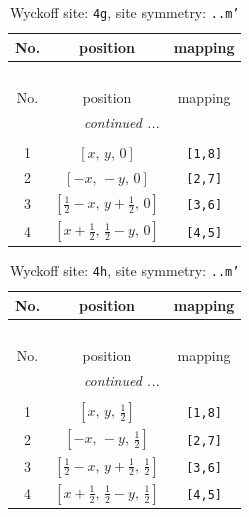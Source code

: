 \documentclass[fleqn,8pt]{jsarticle}
\begin{document}
\renewcommand{\arraystretch}{1.2}
\begin{longtable}{ccc}
\caption{Wyckoff site: {\tt 4g}, site symmetry: {\tt ..m'}}
 \\
 \hline \hline
No. & position & mapping \\ \hline \endfirsthead

\multicolumn{2}{l}{\tablename\ \thetable{}} \\
 \hline \hline
No. & position & mapping \\ \hline \endhead

 \hline \hline
\multicolumn{2}{r}{\footnotesize\it continued ...} \\ \endfoot

 \hline \hline
\multicolumn{2}{r}{} \\ \endlastfoot

1 & $\left[ x,\, y,\, 0 \right]$ & {\tt [1,8]} \\ \hline
2 & $\left[ - x,\, - y,\, 0 \right]$ & {\tt [2,7]} \\ \hline
3 & $\left[ \frac{1}{2} - x,\, y + \frac{1}{2},\, 0 \right]$ & {\tt [3,6]} \\ \hline
4 & $\left[ x + \frac{1}{2},\, \frac{1}{2} - y,\, 0 \right]$ & {\tt [4,5]} \\
\end{longtable}
\renewcommand{\arraystretch}{1.2}
\begin{longtable}{ccc}
\caption{Wyckoff site: {\tt 4h}, site symmetry: {\tt ..m'}}
 \\
 \hline \hline
No. & position & mapping \\ \hline \endfirsthead

\multicolumn{2}{l}{\tablename\ \thetable{}} \\
 \hline \hline
No. & position & mapping \\ \hline \endhead

 \hline \hline
\multicolumn{2}{r}{\footnotesize\it continued ...} \\ \endfoot

 \hline \hline
\multicolumn{2}{r}{} \\ \endlastfoot

1 & $\left[ x,\, y,\, \frac{1}{2} \right]$ & {\tt [1,8]} \\ \hline
2 & $\left[ - x,\, - y,\, \frac{1}{2} \right]$ & {\tt [2,7]} \\ \hline
3 & $\left[ \frac{1}{2} - x,\, y + \frac{1}{2},\, \frac{1}{2} \right]$ & {\tt [3,6]} \\ \hline
4 & $\left[ x + \frac{1}{2},\, \frac{1}{2} - y,\, \frac{1}{2} \right]$ & {\tt [4,5]} \\
\end{longtable}
\end{document}
